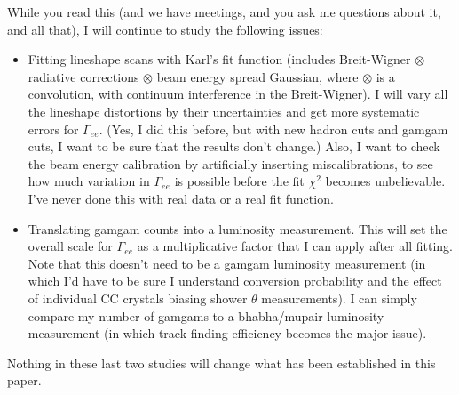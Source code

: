 \documentclass[12pt]{article}
\begin{document}
While you read this (and we have meetings, and you ask me questions
about it, and all that), I will continue to study the following
issues:
\begin{itemize}

  \item Fitting lineshape scans with Karl's fit function (includes
    Breit-Wigner $\otimes$ radiative corrections $\otimes$ beam energy
    spread Gaussian, where $\otimes$ is a convolution, with continuum
    interference in the Breit-Wigner).  I will vary all the lineshape
    distortions by their uncertainties and get more systematic errors
    for $\Gamma_{ee}$.  (Yes, I did this before, but with new hadron
    cuts and gamgam cuts, I want to be sure that the results don't
    change.)  Also, I want to check the beam energy calibration by
    artificially inserting miscalibrations, to see how much variation
    in $\Gamma_{ee}$ is possible before the fit $\chi^2$ becomes
    unbelievable.  I've never done this with real data or a real fit
    function.

  \item Translating gamgam counts into a luminosity measurement.  This
    will set the overall scale for $\Gamma_{ee}$ as a multiplicative
    factor that I can apply after all fitting.  Note that this doesn't
    need to be a gamgam luminosity measurement (in which I'd have to
    be sure I understand conversion probability and the effect of
    individual CC crystals biasing shower $\theta$ measurements).  I
    can simply compare my number of gamgams to a bhabha/mupair
    luminosity measurement (in which track-finding efficiency becomes
    the major issue).

\end{itemize}
Nothing in these last two studies will change what has been
established in this paper.
\end{document}
